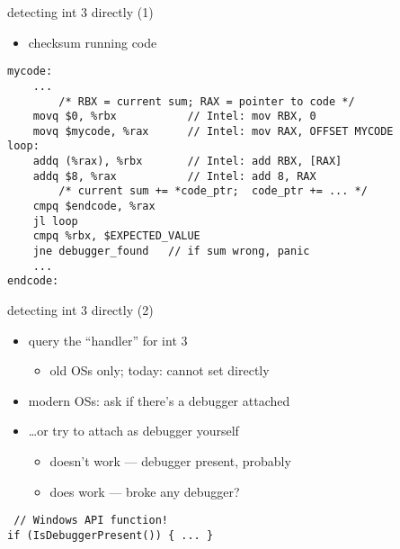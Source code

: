 \begin{frame}[fragile,label=int3Check]{detecting int 3 directly (1)}
\lstset{language=myasm,style=small}
\begin{itemize}
    \item checksum running code
\end{itemize}
\begin{lstlisting}
mycode:                     
    ...
        /* RBX = current sum; RAX = pointer to code */
    movq $0, %rbx           // Intel: mov RBX, 0
    movq $mycode, %rax      // Intel: mov RAX, OFFSET MYCODE
loop:           
    addq (%rax), %rbx       // Intel: add RBX, [RAX]
    addq $8, %rax           // Intel: add 8, RAX
        /* current sum += *code_ptr;  code_ptr += ... */
    cmpq $endcode, %rax
    jl loop
    cmpq %rbx, $EXPECTED_VALUE 
    jne debugger_found   // if sum wrong, panic
    ...
endcode:
\end{lstlisting}
\end{frame}

\begin{frame}[fragile,label=int3OSAPI]{detecting int 3 directly (2)}
\lstset{language=C,style=small}
\begin{itemize}
    \item query the ``handler'' for int 3
        \begin{itemize}
        \item old OSs only; today: cannot set directly
        \end{itemize}
    \item modern OSs: ask if there's a debugger attached
    \item \ldots or try to attach as debugger yourself
        \begin{itemize}
        \item doesn't work --- debugger present, probably
        \item does work --- broke any debugger?
        \end{itemize}
\end{itemize}
\begin{lstlisting}
 // Windows API function!
if (IsDebuggerPresent()) { ... }
\end{lstlisting}
\end{frame}

